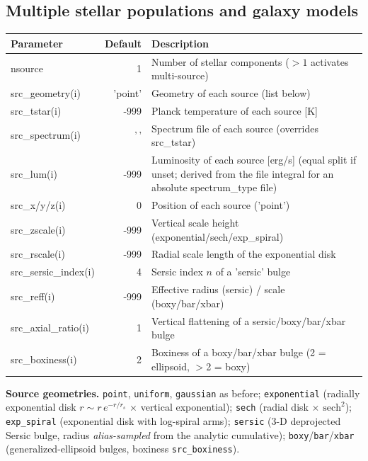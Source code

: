 \documentclass[english,a4paper]{kiseon_memo}
\newcommand{\code}[1]{\texttt{#1}}
\begin{document}
\subsection{Multiple stellar populations and galaxy models}\label{sec:multisource}
\begin{longtable}{P D X}
\toprule
\textrm{Parameter} & \textrm{Default} & \textrm{Description}\\
\midrule \endhead
nsource            & 1       & Number of stellar components ($>1$ activates multi-source)\\
src\_geometry(i)   & 'point' & Geometry of each source (list below)\\
src\_tstar(i)      & -999    & Planck temperature of each source [K]\\
src\_spectrum(i)   & '\,'    & Spectrum file of each source (overrides src\_tstar)\\
src\_lum(i)        & -999    & Luminosity of each source [erg/s] (equal split if unset; derived from the file integral for an absolute spectrum\_type file)\\
src\_x/y/z(i)      & 0       & Position of each source ('point')\\
src\_zscale(i)     & -999    & Vertical scale height (exponential/sech/exp\_spiral)\\
src\_rscale(i)     & -999    & Radial scale length of the exponential disk\\
src\_sersic\_index(i) & 4    & Sersic index $n$ of a 'sersic' bulge\\
src\_reff(i)       & -999    & Effective radius (sersic) / scale (boxy/bar/xbar)\\
src\_axial\_ratio(i) & 1     & Vertical flattening of a sersic/boxy/bar/xbar bulge\\
src\_boxiness(i)   & 2       & Boxiness of a boxy/bar/xbar bulge (2 = ellipsoid, $>$2 = boxy)\\
\bottomrule
\end{longtable}
\noindent\textbf{Source geometries.}  \code{point}, \code{uniform},
\code{gaussian} as before; \code{exponential} (radially exponential disk
$r\sim r\,e^{-r/r_s}$ $\times$ vertical exponential); \code{sech} (radial disk
$\times$ $\mathrm{sech}^2$); \code{exp\_spiral} (exponential disk with log-spiral
arms); \code{sersic} (3-D deprojected Sersic bulge, radius \emph{alias-sampled}
from the analytic cumulative); \code{boxy}/\code{bar}/\code{xbar}
(generalized-ellipsoid bulges, boxiness \code{src\_boxiness}).
\end{document}
